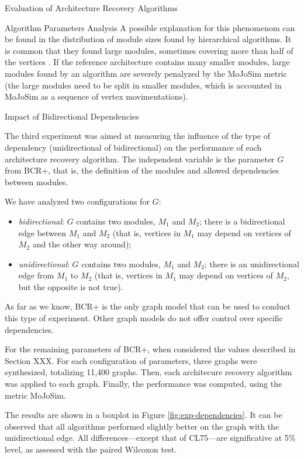 \documentclass[11pt,twocolumn,a4paper,english]{article}
\begin{document}
\begin{section}{Evaluation of Architecture Recovery Algorithms}
\begin{subsection}{Algorithm Parameters Analysis}
	A possible explanation for this phenomenom can be found in the distribution of module sizes found by hierarchical algorithms. It is common that they found large modules, sometimes covering more than half of the vertices \cite{Wu2005}. If the reference architecture contains many smaller modules, large modules found by an algorithm are severely penalyzed by the MoJoSim metric (the large modules need to be split in smaller modules, which is accounted in MoJoSim as a sequence of vertex movimentations).
	
\end{subsection}

\begin{subsection}{Impact of Bidirectional Dependencies}
	
	The third experiment was aimed at measuring the influence of the type of dependency (unidirectional of bidirectional) on the performance of each architecture recovery algorithm. The independent variable is the parameter $G$ from BCR+, that is, the definition of the modules and allowed dependencies between modules.
	
	We have analyzed two configurations for $G$:
	
	\begin{itemize}
		\item \emph{bidirectional}: $G$ contains two modules, $M_1$ and $M_2$; there is a bidirectional edge between $M_1$ and $M_2$ (that is, vertices in $M_1$ may depend on vertices of $M_2$ and the other way around);
		
		\item \emph{unidirectional}: $G$ contains two modules, $M_1$ and $M_2$; there is an unidirectional edge from $M_1$ to $M_2$ (that is, vertices in $M_1$ may depend on vertices of $M_2$, but the opposite is not true).
	\end{itemize}
	
	As far as we know, BCR+ is the only graph model that can be used to conduct this type of experiment. Other graph models do not offer control over specific dependencies.
	
	For the remaining parameters of BCR+, when considered the values described in Section XXX. For each configuration of parameters, three graphs were synthesized, totalizing 11,400 graphs. Then, each architecure recovery algorithm was applied to each graph. Finally, the performance was computed, using the metric MoJoSim.
	
	The results are shown in a boxplot in Figure \ref{fig:exp-dependencies}. It can be observed that all algorithms performed slightly better on the graph with the unidirectional edge. All differences---except that of CL75---are significative at 5\% level, as assessed with the paired Wilcoxon test.
	

\end{subsection}
\end{section}
\end{document}
